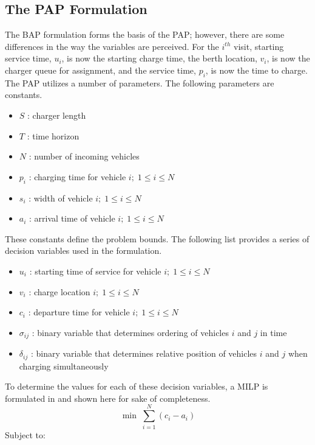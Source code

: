 \documentclass[letterpaper, 10pt, conference]{IEEEtran}
\begin{document}
\subsection{The PAP Formulation}
The BAP formulation forms the basis of the PAP; however, there are some differences in the way the variables are
perceived. For the $i^{th}$ visit, starting service time, $u_i$, is now the starting charge time, the berth location,
$v_i$, is now the charger queue for assignment, and the service time, $p_i$, is now the time to charge. The PAP utilizes a number of parameters. The following parameters are constants.
\begin{itemize}
	\item $S$   : charger length
	\item $T$   : time horizon
	\item $N$   : number of incoming vehicles
	\item $p_i$ : charging time for vehicle $i;\; 1 \leq i \leq N$
	\item $s_i$ : width of vehicle $i;\; 1 \leq i \leq N$
	\item $a_i$ : arrival time of vehicle $i;\; 1 \leq i \leq N$
\end{itemize}
These constants define the problem bounds. The following list provides a series of decision variables used in the formulation.
\begin{itemize}
    \item $u_i$         : starting time of service for vehicle $i;\; 1 \leq i \leq N$
    \item $v_i$         : charge location $i;\; 1 \leq i \leq N$
    \item $c_i$         : departure time for vehicle $i;\; 1 \leq i \leq N$
    \item $\sigma_{ij}$ : binary variable that determines ordering of vehicles $i$ and $j$ in time
    \item $\delta_{ij}$ : binary variable that determines relative position of vehicles $i$ and $j$ when charging simultaneously
\end{itemize}
To determine the values for each of these decision variables, a MILP is formulated in \cite{Qarebagh2019} and shown here for sake of completeness.
\begin{equation}
	\label{eq:bapobjective}
	\min\; \sum_{i=1}^N (c_i - a_i)
\end{equation}
Subject to:
\end{document}
